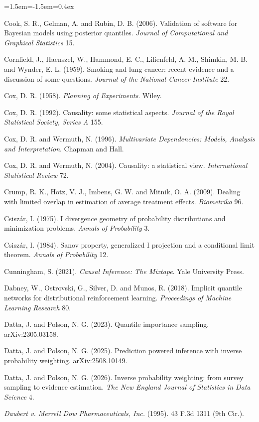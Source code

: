 \begin{list}{}{\leftmargin=1.5em\itemindent=-1.5em\itemsep=0.4ex}
\item Cook, S. R., Gelman, A. and Rubin, D. B. (2006). Validation of software for Bayesian models using posterior quantiles. \emph{Journal of Computational and Graphical Statistics} 15.
\item Cornfield, J., Haenszel, W., Hammond, E. C., Lilienfeld, A. M., Shimkin, M. B. and Wynder, E. L. (1959). Smoking and lung cancer: recent evidence and a discussion of some questions. \emph{Journal of the National Cancer Institute} 22.
\item Cox, D. R. (1958). \emph{Planning of Experiments}. Wiley.
\item Cox, D. R. (1992). Causality: some statistical aspects. \emph{Journal of the Royal Statistical Society, Series A} 155.
\item Cox, D. R. and Wermuth, N. (1996). \emph{Multivariate Dependencies: Models, Analysis and Interpretation}. Chapman and Hall.
\item Cox, D. R. and Wermuth, N. (2004). Causality: a statistical view. \emph{International Statistical Review} 72.
\item Crump, R. K., Hotz, V. J., Imbens, G. W. and Mitnik, O. A. (2009). Dealing with limited overlap in estimation of average treatment effects. \emph{Biometrika} 96.
\item Csisz\'ar, I. (1975). I divergence geometry of probability distributions and minimization problems. \emph{Annals of Probability} 3.
\item Csisz\'ar, I. (1984). Sanov property, generalized I projection and a conditional limit theorem. \emph{Annals of Probability} 12.
\item Cunningham, S. (2021). \emph{Causal Inference: The Mixtape}. Yale University Press.
\item Dabney, W., Ostrovski, G., Silver, D. and Munos, R. (2018). Implicit quantile networks for distributional reinforcement learning. \emph{Proceedings of Machine Learning Research} 80.
\item Datta, J. and Polson, N. G. (2023). Quantile importance sampling. arXiv:2305.03158.
\item Datta, J. and Polson, N. G. (2025). Prediction powered inference with inverse probability weighting. arXiv:2508.10149.
\item Datta, J. and Polson, N. G. (2026). Inverse probability weighting: from survey sampling to evidence estimation. \emph{The New England Journal of Statistics in Data Science} 4.
\item \emph{Daubert v. Merrell Dow Pharmaceuticals, Inc.} (1995). 43 F.3d 1311 (9th Cir.).

\end{list}
